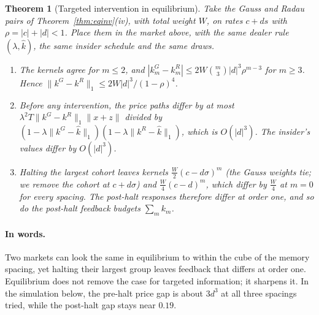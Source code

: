 \documentclass[12pt]{article}
\newtheorem{theorem}{Theorem}[section]
\theoremstyle{definition}
\theoremstyle{remark}
\begin{document}
\begin{theorem}[Targeted intervention in equilibrium]\label{thm:eqhalt}
Take the Gauss and Radau pairs of Theorem~\ref{thm:eqinv}(iv), with total weight $W$, on rates $c+ds$ with $\rho=|c|+|d|<1$. Place them in the market above, with the same dealer rule $(\lambda,\hat k)$, the same insider schedule and the same draws.
\begin{enumerate}[label=(\roman*),itemsep=1pt]
\item The kernels agree for $m\le2$, and $|k^G_m-k^R_m|\le2W\binom m3|d|^3\rho^{m-3}$ for $m\ge3$. Hence $\|k^G-k^R\|_1\le2W|d|^3/(1-\rho)^4$.
\item Before any intervention, the price paths differ by at most $\lambda^2T\|k^G-k^R\|_1\|x+z\|$ divided by $(1-\lambda\|k^G-\hat k\|_1)(1-\lambda\|k^R-\hat k\|_1)$, which is $O(|d|^3)$. The insider's values differ by $O(|d|^3)$.
\item Halting the largest cohort leaves kernels $\tfrac W2(c-d\sigma)^m$ (the Gauss weights tie; we remove the cohort at $c+d\sigma$) and $\tfrac W4(c-d)^m$, which differ by $\tfrac W4$ at $m=0$ for every spacing. The post-halt responses therefore differ at order one, and so do the post-halt feedback budgets $\sum_mk_m$.
\end{enumerate}
\end{theorem}

\paragraph{In words.} Two markets can look the same in equilibrium to within the cube of the memory spacing, yet halting their largest group leaves feedback that differs at order one. Equilibrium does not remove the case for targeted information; it sharpens it. In the simulation below, the pre-halt price gap is about $3d^3$ at all three spacings tried, while the post-halt gap stays near $0.19$.
\end{document}
